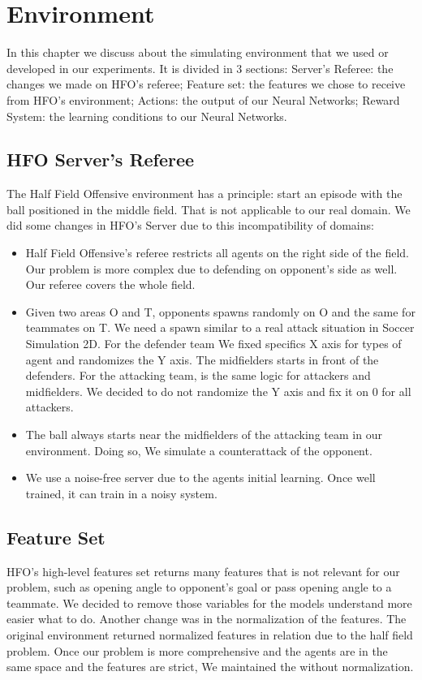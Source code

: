 \chapter{Environment}\label{chapter:environment}
In this chapter we discuss about the simulating environment that we used or developed in our experiments. It is divided in 3 sections: Server's Referee: the changes we made on HFO's referee; Feature set: the features we chose to receive from HFO's environment; Actions: the output of our Neural Networks; Reward System: the learning conditions to our Neural Networks. 

\section{HFO Server's Referee}
The Half Field Offensive environment has a principle: start an episode with the ball positioned in the middle field. That is not applicable to our real domain. We did some changes in HFO's Server due to this incompatibility of domains:

\begin{itemize}
    \item Half Field Offensive's referee restricts all agents on the right side of the field. Our problem is more complex due to defending on opponent's side as well. Our referee covers the whole field.
    \item Given two areas O and T, opponents spawns randomly on O and the same for teammates on T. We need a spawn similar to a real attack situation in Soccer Simulation 2D. For the defender team We fixed specifics X axis for types of agent and randomizes the Y axis. The midfielders starts in front of the defenders. For the attacking team, is the same logic for attackers and midfielders. We decided to do not randomize the Y axis and fix it on 0 for all attackers.   
    \item The ball always starts near the midfielders of the attacking team in our environment. Doing so, We simulate a counterattack of the opponent.
    \item We use a noise-free server due to the agents initial learning. Once well trained, it can train in a noisy system.
\end{itemize}

\section{Feature Set}
HFO's high-level features set returns many features that is not relevant for our problem, such as opening angle to opponent's goal or pass opening angle to a teammate. We decided to remove those variables for the models understand more easier what to do. Another change was in the normalization of the features. The original environment returned normalized features in relation due to the half field problem. Once our problem is more comprehensive and the agents are in the same space and the features are strict, We maintained the without normalization. 

